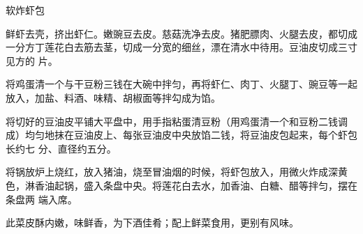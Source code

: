 %
%
%
%
%
%
%
\begin{recipe}{软炸虾包}

\ingredients


\preparation

\step 鲜虾去壳，挤出虾仁。嫩豌豆去皮。慈菇洗净去皮。猪肥膘肉、火腿去皮，都切成
一分方丁莲花白去筋去茎，切成一分宽的细丝，漂在清水中待用。豆油皮切成三寸见方的
片。

\step 将鸡蛋清一个与干豆粉三钱在大碗中拌匀，再将虾仁、肉丁、火腿丁、豌豆等一起
放入，加盐、料酒、味精、胡椒面等拌勾成为馅。

\step 将切好的豆油皮平铺大平盘中，用手指粘蛋清豆粉（用鸡蛋清一个和豆粉二钱调
成）均匀地抹在豆油皮上、每张豆油皮中央放馅二钱，将豆油皮包起来，每个虾包长约七
分、直径约五分。

\step 将锅放炉上烧红，放入猪油，烧至冒油烟的时候，将虾包放入，用微火炸成深黄
色，淋香油起锅，盛入条盘中央。将莲花白去水，加香油、白糖、醋等拌匀，摆在条盘两
端入席。

\features

此菜皮酥内嫩，味鲜香，为下酒佳肴；配上鲜菜食用，更别有风味。

\end{recipe}

